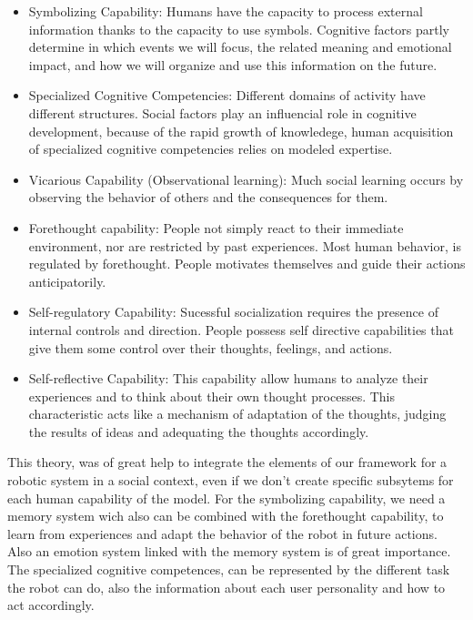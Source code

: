 \begin{itemize}
\item Symbolizing Capability: Humans have the capacity to process external information thanks to the capacity to use symbols. Cognitive factors partly determine in which events we will focus, the related meaning and emotional impact, and how we will organize and use this information on the future.

\item Specialized Cognitive Competencies: Different domains of activity have different structures. Social factors play an influencial role in cognitive development, because of the rapid growth of knowledege, human acquisition of specialized cognitive competencies relies on modeled expertise. 

\item Vicarious Capability (Observational learning): Much social learning occurs by observing the behavior of others and the consequences for them.

\item Forethought capability: People not simply react to their immediate environment, nor are restricted by past experiences. Most human behavior, is regulated by forethought. People motivates themselves and guide their actions anticipatorily.

\item Self-regulatory Capability: Sucessful socialization requires the presence of internal controls and direction. People possess self directive capabilities that give them some control over their thoughts, feelings, and actions.

\item Self-reflective Capability: This capability allow humans to analyze their experiences and to think about their own thought processes. This characteristic acts like a mechanism of adaptation of the thoughts, judging the results of ideas and adequating the thoughts accordingly.

\end{itemize}

This theory, was of great help to integrate the elements of our framework for a robotic system in a social context, even if we don't create specific subsytems for each human capability of the model. For the symbolizing capability, we need a memory system wich also can be combined with the forethought capability, to learn from experiences and adapt the behavior of the robot in future actions. Also an emotion system linked with the memory system is of great importance. The specialized cognitive competences, can be represented by the different task the robot can do, also the information about each user personality and how to act accordingly. 

